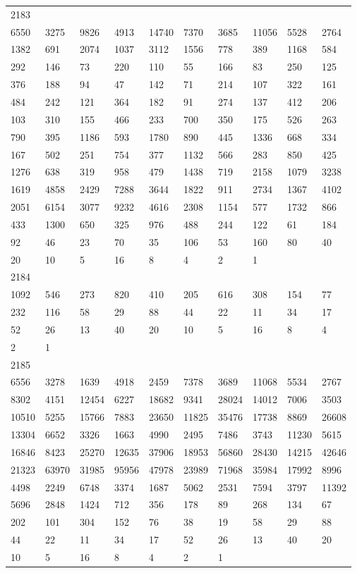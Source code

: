 \begin{longtable}{*{10}{l}}
2183&&&&&&&&&\\
6550& 3275& 9826& 4913& 14740& 7370& 3685& 11056& 5528& 2764\\
1382& 691& 2074& 1037& 3112& 1556& 778& 389& 1168& 584\\
292& 146& 73& 220& 110& 55& 166& 83& 250& 125\\
376& 188& 94& 47& 142& 71& 214& 107& 322& 161\\
484& 242& 121& 364& 182& 91& 274& 137& 412& 206\\
103& 310& 155& 466& 233& 700& 350& 175& 526& 263\\
790& 395& 1186& 593& 1780& 890& 445& 1336& 668& 334\\
167& 502& 251& 754& 377& 1132& 566& 283& 850& 425\\
1276& 638& 319& 958& 479& 1438& 719& 2158& 1079& 3238\\
1619& 4858& 2429& 7288& 3644& 1822& 911& 2734& 1367& 4102\\
2051& 6154& 3077& 9232& 4616& 2308& 1154& 577& 1732& 866\\
433& 1300& 650& 325& 976& 488& 244& 122& 61& 184\\
92& 46& 23& 70& 35& 106& 53& 160& 80& 40\\
20& 10& 5& 16& 8& 4& 2& 1& \\

2184&&&&&&&&&\\
1092& 546& 273& 820& 410& 205& 616& 308& 154& 77\\
232& 116& 58& 29& 88& 44& 22& 11& 34& 17\\
52& 26& 13& 40& 20& 10& 5& 16& 8& 4\\
2& 1& \\

2185&&&&&&&&&\\
6556& 3278& 1639& 4918& 2459& 7378& 3689& 11068& 5534& 2767\\
8302& 4151& 12454& 6227& 18682& 9341& 28024& 14012& 7006& 3503\\
10510& 5255& 15766& 7883& 23650& 11825& 35476& 17738& 8869& 26608\\
13304& 6652& 3326& 1663& 4990& 2495& 7486& 3743& 11230& 5615\\
16846& 8423& 25270& 12635& 37906& 18953& 56860& 28430& 14215& 42646\\
21323& 63970& 31985& 95956& 47978& 23989& 71968& 35984& 17992& 8996\\
4498& 2249& 6748& 3374& 1687& 5062& 2531& 7594& 3797& 11392\\
5696& 2848& 1424& 712& 356& 178& 89& 268& 134& 67\\
202& 101& 304& 152& 76& 38& 19& 58& 29& 88\\
44& 22& 11& 34& 17& 52& 26& 13& 40& 20\\
10& 5& 16& 8& 4& 2& 1& \\


\end{longtable}
